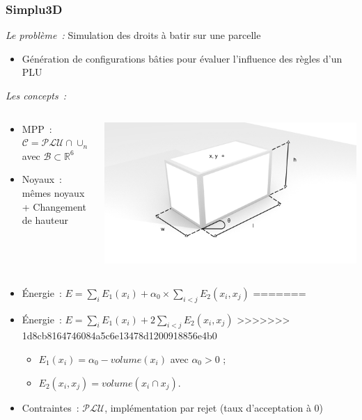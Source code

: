 \documentclass{beamer}
\begin{document}
\begin{frame}
\frametitle{Simplu3D}
\emph{Le probl\`eme~:}  Simulation des droits \`a batir sur une parcelle
\begin{itemize}
\item Génération de configurations bâties pour évaluer l'influence des règles d'un PLU
\end{itemize}
\emph{Les concepts~:}
\begin{columns}
\begin{column}{0.55\textwidth}
\begin{itemize}
\item MPP~: $ \mathcal{C} =\mathcal{PLU} \cap \cup_{n} \mathcal{B}^n$\\avec $\mathcal{B}  \subset  \mathds{R}^{6}$
\item Noyaux~: mêmes noyaux + Changement de hauteur
\end{itemize}
\end{column}
\begin{column}{0.45\textwidth}
 \includegraphics[width=\textwidth]{boiteFin.png}
\end{column}
\end{columns}
\begin{itemize}
<<<<<<< HEAD
\item \'Energie~: $E = \sum_i E_1(x_i) + \alpha_{0} \times \sum_{i<j} E_2(x_i,x_j)$
=======
\item Énergie~:  $E = \sum_i E_1(x_i) + 2\sum_{i<j} E_2(x_i,x_j)$
>>>>>>> 1d8cb8164746084a5c6e13478d1200918856e4b0
\begin{itemize}
\item $E_1(x_i)=\alpha_{0} - volume(x_i)$ avec $\alpha_{0}>0$ ;
\item $E_2(x_i,x_j) = volume(x_i \cap x_j)$.
\end{itemize}
\item Contraintes~:  $\mathcal{PLU}$, implémentation par rejet (taux d'acceptation à 0)
\end{itemize}
\end{frame}
\end{document}
